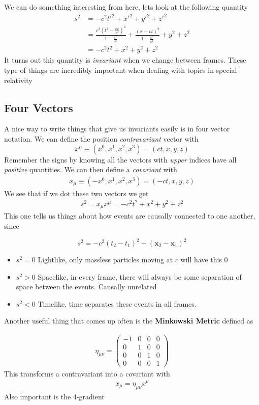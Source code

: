 We can do something interesting from here, lets look at the following quantity
\begin{align}
    s^2 &= -c^2t'^2 +x'^2 + y'^2 + z'^2\\
    &= \frac{c^2(t^2 - \frac{vx}{c^2})^2}{1-\frac{v^2}{c^2}}  + \frac{(x - vt)^2}{1-\frac{v^2}{c^2}} + y^2 + z^2\\
    &= -c^2t^2 + x^2 + y^2 + z^2
\end{align}
It turns out this quantity is \emph{invariant} when we change between frames. These type of things are incredibly important when dealing with topics in special relativity

\subsection{Four Vectors}
A nice way to write things that give us invariants easily is in four vector notation. We can define the position \emph{contravariant} vector with
$$ x^\mu \equiv (x^0, x^1,x^2,x^3) = (ct,x,y,z) $$
Remember the signs by knowing all the vectors with \textit{upper} indices have all \textit{positive} quantities. We can then define a \emph{covariant} with
\begin{align}
     x_\mu \equiv (-x^0, x^1,x^2,x^3) = (-ct,x,y,z) 
\end{align}
We see that if we dot these two vectors we get 
\begin{align}
    s^2 = x_\mu x^\mu = -c^2t^2 + x^2 + y^2 + z^2
    \end{align}
This one tells us things about how events are causally connected to one another, since

$$s^2 = - c^2(t_2-t_1)^2 + (\textbf{x}_2-\textbf{x}_1)^2$$

\begin{itemize}
\item $s^2 = 0$ Lightlike, only massless particles moving at $c$ will have this 0 
\item $s^2 > 0$ Spacelike, in every frame, there will always be some separation of space between the events. Causally unrelated
\item $s^2 < 0$ Timelike, time separates these events in all frames.
\end{itemize}

Another useful thing that comes up often is the \textbf{Minkowski Metric} defined as 

\begin{align}
\eta_{\mu\nu} = \left(
{\begin{array}{cccc}
-1&0&0&0\\
0&1&0&0\\
0&0&1&0\\
0&0&0&1
\end{array}}
\right)
\end{align}
This transforms a contravariant into a covariant with
\begin{align}
    x_\mu = \eta_{\mu\nu}x^\nu
\end{align}
Also important is the 4-gradient


